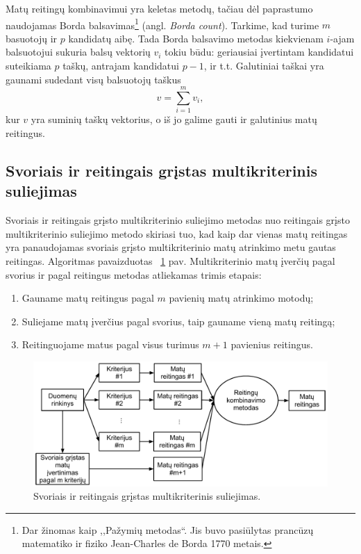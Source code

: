 Matų reitingų kombinavimui yra keletas metodų\cite{dwork2001rank}, tačiau dėl paprastumo naudojamas Borda balsavimas\footnote{Dar žinomas kaip ,,Pažymių metodas``. Jis buvo pasiūlytas prancūzų matematiko ir fiziko Jean-Charles de Borda 1770 metais.} (angl.\textit{ Borda count}). Tarkime, kad turime $m$ basuotojų ir $p$ kandidatų aibę. Tada Borda balsavimo metodas kiekvienam $i$-ajam balsuotojui sukuria balsų vektorių $v_i$ tokiu būdu: geriausiai įvertintam kandidatui suteikiama $p$ taškų, antrajam kandidatui $p-1$, ir t.t. Galutiniai taškai yra gaunami sudedant visų balsuotojų taškus
\begin{equation}
 v = \sum_{i=1}^m v_i,
\end{equation}
kur $v$ yra suminių taškų vektorius, o iš jo galime gauti ir galutinius matų reitingus.

\subsection{Svoriais ir reitingais grįstas multikriterinis suliejimas}

Svoriais ir reitingais grįsto multikriterinio suliejimo metodas nuo reitingais grįsto multikriterinio suliejimo metodo skiriasi tuo, kad kaip dar vienas matų reitingas yra panaudojamas svoriais grįsto multikriterinio matų atrinkimo metu gautas reitingas. Algoritmas pavaizduotas ~\ref{fig:figure3} pav. Multikriterinio matų įverčių pagal svorius ir pagal reitingus metodas atliekamas trimis etapais:
\begin{enumerate}
  \item Gauname matų reitingus pagal $m$ pavienių matų atrinkimo motodų;
  \item Suliejame matų įverčius pagal svorius, taip gauname vieną matų reitingą;
  \item Reitinguojame matus pagal visus turimus $m+1$ pavienius reitingus.
\end{enumerate} 
\begin{figure}
 \centering
 \includegraphics[width=1\textwidth]{images/score_and_ranking_based_fusion.pdf}
 \caption{Svoriais ir reitingais grįstas multikriterinis suliejimas.}
 \label{fig:figure3}
\end{figure}


